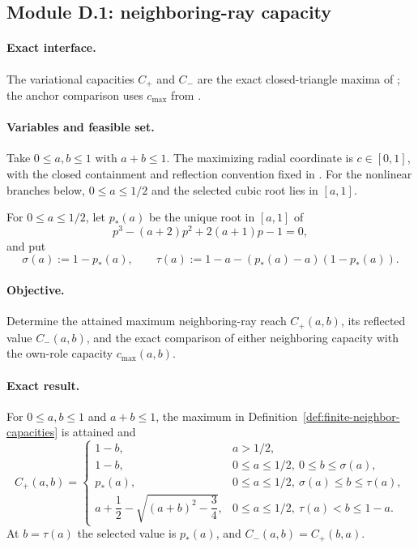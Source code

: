 \subsection{Module D.1: neighboring-ray capacity}
\label{subsec:app-neighbor-ray-capacity}

\paragraph{Exact interface.}
The variational capacities $C_+$ and $C_-$ are the exact closed-triangle
maxima of ; the anchor comparison uses
$c_{\max}$ from .

\paragraph{Variables and feasible set.}
Take $0\le a,b\le1$ with $a+b\le1$.  The maximizing radial coordinate is
$c\in[0,1]$, with the closed containment and reflection convention fixed in
.  For the nonlinear branches below,
$0\le a\le1/2$ and the selected cubic root lies in $[a,1]$.

For $0\le a\le1/2$, let $p_*(a)$ be the unique root in $[a,1]$ of
\[
 p^3-(a+2)p^2+2(a+1)p-1=0,
\]
and put
\[
 \sigma(a):=1-p_*(a),
 \qquad
 \tau(a):=1-a-(p_*(a)-a)(1-p_*(a)).
\]

\paragraph{Objective.}
Determine the attained maximum neighboring-ray reach $C_+(a,b)$, its
reflected value $C_-(a,b)$, and the exact comparison of either neighboring
capacity with the own-role capacity $c_{\max}(a,b)$.

\paragraph{Exact result.}

\begin{proposition}
\label{prop:app-neighbor-ray-formula}
For $0\le a,b\le1$ and $a+b\le1$, the maximum in
Definition~\ref{def:finite-neighbor-capacities} is attained and
\[
C_+(a,b)=
\begin{cases}
1-b,&a>1/2,\\
1-b,&0\le a\le1/2,\ 0\le b\le\sigma(a),\\
p_*(a),&0\le a\le1/2,\ \sigma(a)\le b\le\tau(a),\\
a+\dfrac12-\sqrt{(a+b)^2-\dfrac34},
 &0\le a\le1/2,\ \tau(a)<b\le1-a.
\end{cases}
\]
At $b=\tau(a)$ the selected value is $p_*(a)$, and
$C_-(a,b)=C_+(b,a)$.
\end{proposition}

